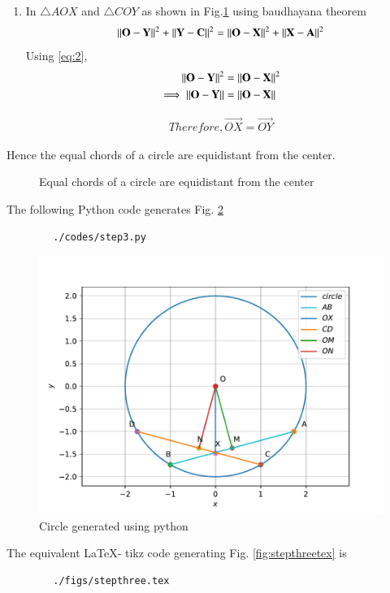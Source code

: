 \begin{enumerate}[label=\thesection.\arabic*.,ref=\thesection.\theenumi]
\begin{enumerate}
	\item In $\triangle AOX$ and $\triangle COY $ as shown in Fig.\ref{fig:steptwotex} using baudhayana theorem
	\begin{align}
	\left\lVert\mathbf{O-Y}\right\rVert^2 + \left\lVert\mathbf{Y-C}\right\rVert^2 = \left\lVert\mathbf{O-X}\right\rVert^2 + \left\lVert\mathbf{X-A}\right\rVert^2
	\end{align}
	Using \eqref{eq:2}, 
	\begin{align}
	\left\lVert\mathbf{O-Y}\right\rVert^2 &= \left\lVert\mathbf{O-X}\right\rVert^2
	\\
	\implies \left\lVert\mathbf{O-Y}\right\rVert &= \left\lVert\mathbf{O-X}\right\rVert
	\end{align}
	
	\begin{align}
	Therefore, \vec{OX}=\vec{OY} \label{eq:3}
	\end{align}
\end{enumerate}
	Hence the equal chords of a circle are equidistant from the center.\\

  
\begin{figure}[!ht]
\centering
\resizebox{\columnwidth}{!}{}
\caption{Equal chords of a circle are equidistant from the center}
\label{fig:steptwotex}	
\end{figure}


The  following Python code generates Fig. \ref{fig:stepthree}\\
    \begin{lstlisting}
        ./codes/step3.py
    \end{lstlisting}

    \begin{figure}[!ht]
	\centering
	\includegraphics[width=\columnwidth]{./figs/step3.pdf}
	\caption{Circle generated using python}
	\label{fig:stepthree}
    \end{figure}
      The equivalent \LaTeX{}- tikz code generating Fig. \ref{fig:stepthreetex} is
    \begin{lstlisting}
        ./figs/stepthree.tex
    \end{lstlisting}
	

\end{enumerate}

